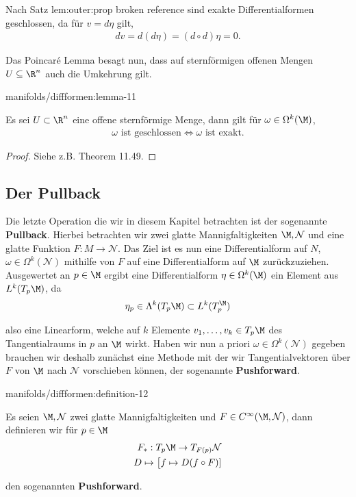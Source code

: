 \documentclass[letterpaper,10pt,german]{jupyterBook}
\begin{document}
\par
Nach Satz {lem:outer:prop broken reference} sind exakte Differentialformen geschlossen, da für \(v=d\eta\) gilt,
\begin{align*}
dv = d(d\eta) = (d\circ d)\eta = 0.
\end{align*}
\par
Das Poincaré Lemma besagt nun, dass auf sternförmigen offenen Mengen \(U\subseteq \R^n\) auch die Umkehrung gilt.
\begin{lemma}{}{manifolds/diffformen:lemma-11}



\par
Es sei \(U\subset\R^n\) eine offene sternförmige Menge, dann gilt für \(\omega\in \Omega^k(\M)\),
\begin{align*}
\omega\text{ ist geschlossen}\Leftrightarrow \omega\text{ ist exakt.}
\end{align*}\end{lemma}

\begin{proof}
 Siehe z.B. \cite{Lee03} Theorem 11.49.
\end{proof}


\subsection{Der Pullback}
\label{\detokenize{manifolds/diffformen:der-pullback}}
\par
Die letzte Operation die wir in diesem Kapitel betrachten ist der sogenannte \textbf{Pullback}. Hierbei betrachten wir zwei glatte Mannigfaltigkeiten \(\M,\mathcal{N}\) und eine glatte Funktion \(F:M\to\mathcal{N}\). Das Ziel ist es nun eine Differentialform auf \(N\), \(\omega\in\Omega^k(\mathcal{N})\) mithilfe von \(F\) auf eine Differentialform auf \(\M\) zurückzuziehen. Ausgewertet an \(p\in\M\) ergibt eine Differentialform \(\eta\in\Omega^k(\M)\) ein Element aus \(L^k(T_p\M)\), da
\begin{align*}
\eta_p\in \Lambda^k(T_p\M) \subset L^k(T_p^\M)
\end{align*}
\par
also eine Linearform, welche auf \(k\) Elemente \(v_1,\ldots,v_k\in T_p\M\) des Tangentialraums in \(p\) an \(\M\) wirkt. Haben wir nun a priori \(\omega\in\Omega^k(\mathcal{N})\) gegeben brauchen wir deshalb zunächst eine Methode mit der wir Tangentialvektoren über \(F\) von \(\M\) nach \(\mathcal{N}\) vorschieben können, der sogenannte \textbf{Pushforward}.
\begin{definition}{}{manifolds/diffformen:definition-12}



\par
Es seien \(\M,\mathcal{N}\) zwei glatte Mannigfaltigkeiten und \(F\in C^\infty(\M,\mathcal{N})\), dann definieren wir für \(p\in\M\)
\begin{align*}
F_\ast:T_p\M\to T_{F(p)}\mathcal{N}\\
D\mapsto \big[f\mapsto D(f\circ F)]
\end{align*}
\par
den sogenannten \textbf{Pushforward}.
\end{definition}
\end{document}
